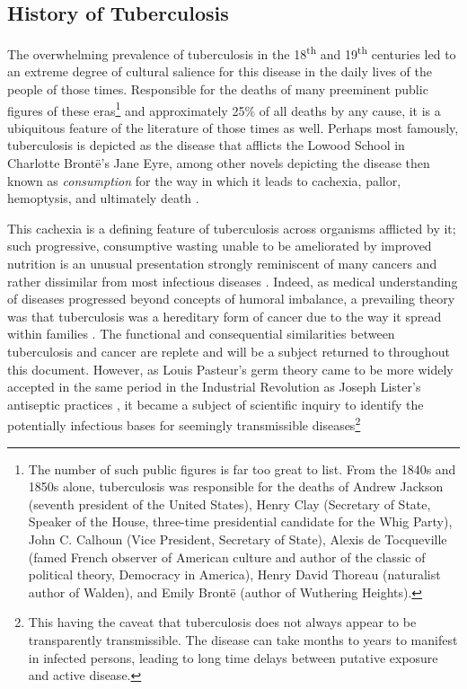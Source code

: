 \subsection{History of Tuberculosis}\label{tbhistory}

The overwhelming prevalence of tuberculosis in the 18\textsuperscript{th} and 19\textsuperscript{th} centuries led to an extreme degree of cultural salience for this disease in the daily lives of the people of those times. Responsible for the deaths of many preeminent public figures of these eras\footnote{The number of such public figures is far too great to list. From the 1840s and 1850s alone, tuberculosis was responsible for the deaths of Andrew Jackson (seventh president of the United States), Henry Clay (Secretary of State, Speaker of the House, three-time presidential candidate for the Whig Party), John C. Calhoun (Vice President, Secretary of State), Alexis de Tocqueville (famed French observer of American culture and author of the classic of political theory, Democracy in America), Henry David Thoreau (naturalist author of Walden), and Emily Bront\"{e} (author of Wuthering Heights).} and approximately 25\% of all deaths by any cause, it is  a ubiquitous feature of the literature of those times as well. Perhaps most famously, tuberculosis is depicted as the disease that afflicts the Lowood School in Charlotte Bront\"{e}'s Jane Eyre, among other novels depicting the disease then known as \textit{consumption} for the way in which it leads to cachexia, pallor, hemoptysis, and ultimately death \citep{Bronte1847, Loddenkemper2015}.

This cachexia is a defining feature of tuberculosis across organisms afflicted by it; such progressive, consumptive wasting unable to be ameliorated by improved nutrition is an unusual presentation strongly reminiscent of many cancers and rather dissimilar from most infectious diseases \citep{Tisdale2002, Silva1988, Martignoni2003, Chang2013}. Indeed, as medical understanding of diseases progressed beyond concepts of humoral imbalance, a prevailing theory was that tuberculosis was a hereditary form of cancer due to the way it spread within families \citep{Frith2014}. The functional and consequential similarities between tuberculosis and cancer are replete and will be a subject returned to throughout this document. However, as Louis Pasteur's germ theory \citep{Smith2012} came to be more widely accepted in the same period in the Industrial Revolution as Joseph Lister's antiseptic practices \citep{ToledoPereyra2010}, it became a subject of scientific inquiry to identify the potentially infectious bases for seemingly transmissible diseases\footnote{This having the caveat that tuberculosis does not always appear to be transparently transmissible. The disease can take months to years to manifest in infected persons, leading to long time delays between putative exposure and active disease\citep{Behr2018}.} 

